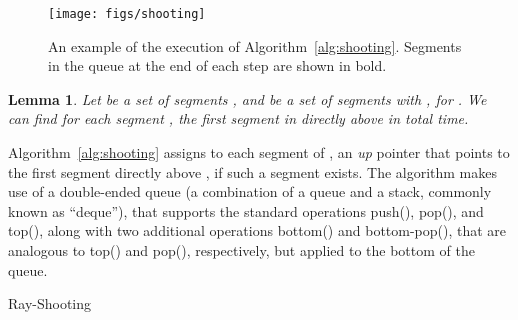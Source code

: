\documentclass[12pt]{dalthesis}
\def\favoritefont{\bfseries \sffamily}
\def\QED{\ensuremath{{\Box}}}
\def\markatright#1{\leavevmode\unskip\nobreak\quad\hspace*{\fill}{#1}}
\newenvironment{proof}
	{\begin{trivlist}\item[\hskip\labelsep{\favoritefont Proof:}]}
	{\markatright{\QED}\end{trivlist}}
\newtheorem{lemma}[theorem]{Lemma}
\begin{document}
\begin{figure}[t]
	\centering
	\texttt{[image: figs/shooting]}
	\caption{An example of the execution of Algorithm~\ref{alg:shooting}.
Segments in the queue at the end of each step are shown in bold.
	}
	\label{fig:shooting}
\end{figure}


\begin{lemma} \label{lemma:shooting}
	Let  be a set of segments
	, and 
	 be a set of segments 
	with , for . 
	We can find for each segment , the first segment in  
	directly above  in  total time.
\end{lemma}


\begin{proof}
	Algorithm~\ref{alg:shooting} assigns to each segment  of ,
	an \emph{up} pointer that points to the first segment directly above ,
	if such a segment exists. 
	The algorithm makes use of a double-ended queue  
	(a combination of a queue and a stack, commonly known as ``deque''),
	that supports the standard operations
	{\sc push}(), {\sc pop}(), and {\sc top}(),
	along with two additional operations
	{\sc bottom}() and {\sc bottom-pop}(), that are analogous to
	{\sc top}() and {\sc pop}(), respectively,
	but applied to the bottom of the queue.


\begin{algorithm} [h]
\caption {\sc Ray-Shooting} \label{alg:shooting}
\begin{algorithmic}[1]
	\vspace{0.5em}
	\baselineskip
	\STATE 
	\STATE 
		\WHILE {}  \label{l:w1-1}
			\STATE  \label{l:w1-2}
		\ENDWHILE 
		\WHILE {}  \label{l:w2-1}
			\STATE  \label{l:w2-2}
		\ENDWHILE 
		\STATE 
	\ENDFOR 
\end{algorithmic}
\end{algorithm}
	

\end{proof}
\end{document}
